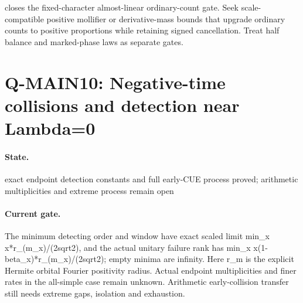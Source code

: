 closes the fixed-character almost-linear ordinary-count gate. Seek scale-compatible positive mollifier or derivative-mass bounds that upgrade ordinary counts to positive proportions while retaining signed cancellation. Treat half balance and marked-phase laws as separate gates.

\section{Q-MAIN10: Negative-time collisions and detection near Lambda=0}
\paragraph{State.} exact endpoint detection constants and full early-CUE process proved; arithmetic multiplicities and extreme process remain open
\paragraph{Current gate.} The minimum detecting order and window have exact scaled limit min\_x x*r\_(m\_x)/(2sqrt2), and the actual unitary failure rank has min\_x x(1-beta\_x)*r\_(m\_x)/(2sqrt2); empty minima are infinity. Here r\_m is the explicit Hermite orbital Fourier positivity radius. Actual endpoint multiplicities and finer rates in the all-simple case remain unknown. Arithmetic early-collision transfer still needs extreme gaps, isolation and exhaustion.
